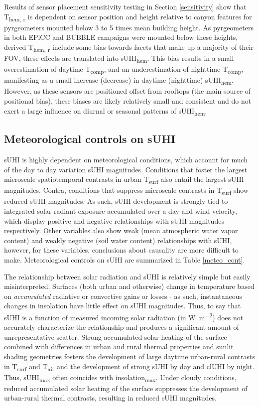\begin{bibunit}
Results of sensor placement sensitivity testing in Section \ref{sensitivity} show that T\textsubscript{hem, r} is dependent on sensor position and height relative to canyon features for pyrgeometers mounted below 3 to 5 times mean building height. As pyrgeometers in both EPiCC and BUBBLE campaigns were mounted below these heights, derived T\textsubscript{hem, r} include some bias towards facets that make up a majority of their FOV, these effects are translated into sUHI\textsubscript{hem}. This bias results in a small overestimation of daytime T\textsubscript{comp}, and an underestimation of nighttime T\textsubscript{comp}, manifesting as a small increase (decrease) in daytime (nighttime) sUHI\textsubscript{hem}. However, as these sensors are positioned offset from rooftops (the main source of positional bias), these biases are likely relatively small and consistent and do not exert a large influence on diurnal or seasonal patterns of sUHI\textsubscript{hem}.

\subsection{Meteorological controls on sUHI}

sUHI is highly dependent on meteorological conditions, which account for much of the day to day variation sUHI magnitudes. Conditions that foster the largest microscale spatiotemporal contrasts in urban T\textsubscript{surf} also entail the largest sUHI magnitudes. Contra, conditions that suppress microscale contrasts in T\textsubscript{surf} show reduced sUHI magnitudes. As such, sUHI development is strongly tied to integrated solar radiant exposure accumulated over a day and wind velocity, which display positive and negative relationships with sUHI magnitudes respectively. Other variables also show weak (mean atmospheric water vapor content) and weakly negative (soil water content) relationships with sUHI, however, for these variables, conclusions about causality are more difficult to make. Meteorological controls on sUHI are summarized in Table \ref{meteo_cont}.

The relationship between solar radiation and sUHI is relatively simple but easily misinterpreted. Surfaces (both urban and otherwise) change in temperature based on \textit{accumulated} radiative or convective gains or losses - as such, instantaneous changes in insolation have little effect on sUHI magnitudes. Thus, to say that sUHI is a function of measured incoming solar radiation (in \si{\watt\per\square\meter}) does not accurately characterize the relationship and produces a significant amount of unrepresentative scatter. Strong accumulated solar heating of the surface combined with differences in urban and rural thermal properties and sunlit shading geometries fosters the development of large daytime urban-rural contrasts in T\textsubscript{surf} and T\textsubscript{air} and the development of strong sUHI by day and clUHI by night. Thus, sUHI\textsubscript{max} often coincides with insolation\textsubscript{max}. Under cloudy conditions, reduced accumulated solar heating of the surface suppresses the development of urban-rural thermal contrasts, resulting in reduced sUHI magnitudes. 


\end{bibunit}
